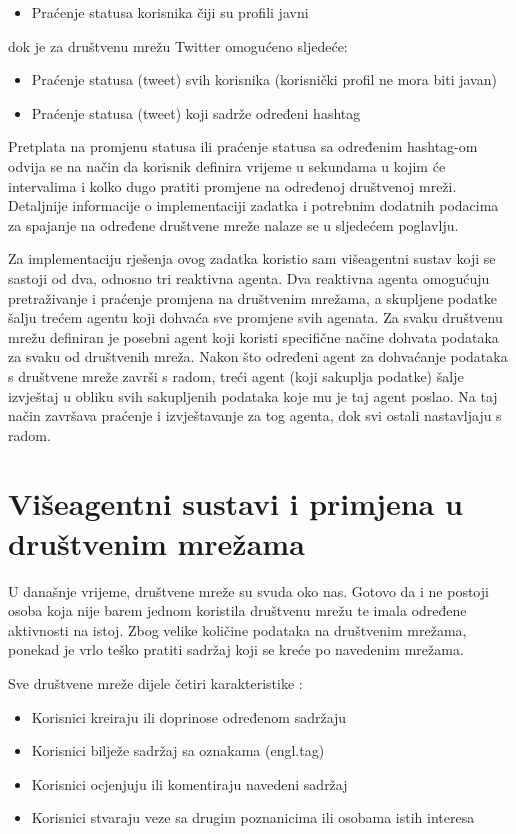 \documentclass[a4paper,12pt]{foi}
\begin{document}
\begin{itemize}
\item{Praćenje statusa korisnika čiji su profili javni}
\end{itemize}
dok je za društvenu mrežu Twitter omogućeno sljedeće:
\begin{itemize}
\item{Praćenje statusa (tweet) svih korisnika (korisnički profil ne mora biti javan)}
\item{Praćenje statusa (tweet) koji sadrže određeni hashtag}
\end{itemize}

Pretplata na promjenu statusa ili praćenje statusa sa određenim hashtag-om odvija se na način da korisnik definira vrijeme u sekundama u kojim će intervalima i kolko dugo pratiti promjene na određenoj društvenoj mreži. Detaljnije informacije o implementaciji zadatka i potrebnim dodatnih podacima za spajanje na određene društvene mreže nalaze se u sljedećem poglavlju.

Za implementaciju rješenja ovog zadatka koristio sam višeagentni sustav koji se sastoji od dva, odnosno tri reaktivna agenta. Dva reaktivna agenta omogućuju pretraživanje i praćenje promjena na društvenim mrežama, a skupljene podatke šalju trećem agentu koji dohvaća sve promjene svih agenata. Za svaku društvenu mrežu definiran je posebni agent koji koristi specifične načine dohvata podataka za svaku od društvenih mreža. Nakon što određeni agent za dohvaćanje podataka s društvene mreže završi s radom, treći agent (koji sakuplja podatke) šalje izvještaj u obliku svih sakupljenih podataka koje mu je taj agent poslao. Na taj način završava praćenje i izvještavanje za tog agenta, dok svi ostali nastavljaju s radom.

\section{Višeagentni sustavi i primjena u društvenim mrežama}

U današnje vrijeme, društvene mreže su svuda oko nas. Gotovo da i ne postoji osoba koja nije barem jednom koristila društvenu mrežu te imala određene aktivnosti na istoj. Zbog velike količine podataka na društvenim mrežama, ponekad je vrlo teško pratiti sadržaj koji se kreće po navedenim mrežama.

Sve društvene mreže dijele četiri karakteristike \citep{Lerman2008}:

\begin{itemize}
\item{Korisnici kreiraju ili doprinose određenom sadržaju}
\item{Korisnici bilježe sadržaj sa oznakama (engl.tag)}
\item{Korisnici ocjenjuju ili komentiraju navedeni sadržaj}
\item{Korisnici stvaraju veze sa drugim poznanicima ili osobama istih 	interesa}
\end{itemize}
\end{document}
